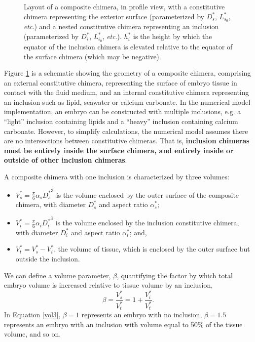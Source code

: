 \documentclass[10pt,a4paper]{article}
\def\etc{\emph{etc}.\xspace}
\begin{document}
\begin{figure}[t]
\begin{center}
{\begin{tikzpicture}
			\end{tikzpicture}
		}
	\end{center}
	\caption{Layout of a composite chimera, in profile view, with a constitutive chimera representing the exterior surface (parameterized by $D_s^*$, $L^*_{s_0}$, \etc) and a nested constitutive chimera representing an inclusion (parameterized by $D_i^*$, $L^*_{i_0}$, \etc). 
	$h_i^*$ is the height by which the equator of the inclusion chimera is elevated relative to the equator of the surface chimera (which may be negative). 
	} \label{fig:chimera2}
\end{figure}
\noindent
Figure \ref{fig:chimera2} is a schematic showing the geometry of a composite chimera, comprising an external constitutive chimera, representing the surface of embryo tissue in contact with the fluid medium, and an internal constitutive chimera representing an inclusion such as lipid, seawater or calcium carbonate.
In the numerical model implementation, an embryo can be constructed with multiple inclusions, e.g. a ``light'' inclusion containing lipids and a ``heavy'' inclusion containing calcium carbonate.
However, to simplify calculations, the numerical model assumes there are no intersections between constitutive chimeras.
That is, \textbf{inclusion chimeras must be entirely inside the surface chimera, and entirely inside or outside of other inclusion chimeras}.

A composite chimera with one inclusion is characterized by three volumes:
\begin{itemize}
	\item $V_s^* = \frac{\pi}{6} \alpha_s {D_s^*}^3$ is the volume enclosed by the outer surface of the composite chimera, with diameter $D_s^*$ and aspect ratio $\alpha_s^*$;
	\item $V_i^* = \frac{\pi}{6} \alpha_i {D_i^*}^3$ is the volume enclosed by the inclusion constitutive chimera, with diameter $D_i^*$ and aspect ratio $\alpha_i^*$; and,
	\item $V_t^* = V_s^* - V_i^*$, the volume of tissue, which is enclosed by the outer surface but outside the inclusion. 
\end{itemize}
We can define a volume parameter, $\beta$, quantifying the factor by which total embryo volume is increased relative to tissue volume by an inclusion,
\begin{equation}\label{vol3}
	\beta = \frac{V_s^*}{V_t^*} = 1 + \frac{V_i^*}{V_t^*}.
\end{equation}
In Equation \ref{vol3}, $\beta = 1$ represents an embryo with no inclusion, $\beta = 1.5$ represents an embryo with an inclusion with volume equal to 50\% of the tissue volume, and so on.
\end{document}

